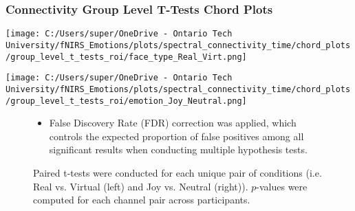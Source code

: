 \documentclass{beamer}
\begin{document}
\begin{frame}
    \frametitle{Connectivity Group Level T-Tests Chord Plots}
    \begin{minipage}[t]{0.45\textwidth}
        \vspace{-\baselineskip}
        \texttt{[image: C:/Users/super/OneDrive - Ontario Tech University/fNIRS\_Emotions/plots/spectral\_connectivity\_time/chord\_plots/group\_level\_t\_tests\_roi/face\_type\_Real\_Virt.png]}
    \end{minipage}
    \begin{minipage}[t]{0.45\textwidth}
        \vspace{-\baselineskip}
        \texttt{[image: C:/Users/super/OneDrive - Ontario Tech University/fNIRS\_Emotions/plots/spectral\_connectivity\_time/chord\_plots/group\_level\_t\_tests\_roi/emotion\_Joy\_Neutral.png]}
    \end{minipage}
    \begin{figure}
        \caption{Paired t-tests were conducted for each unique pair of conditions (i.e. Real vs. Virtual (left) and Joy vs. Neutral (right)).
        $p$-values were computed for each channel pair across participants. }
        \begin{itemize}
            \item False Discovery Rate (FDR) correction was applied, which controls the expected proportion of false positives among all significant results when conducting multiple hypothesis tests.
        \end{itemize}
    \end{figure}
\end{frame}
\end{document}
